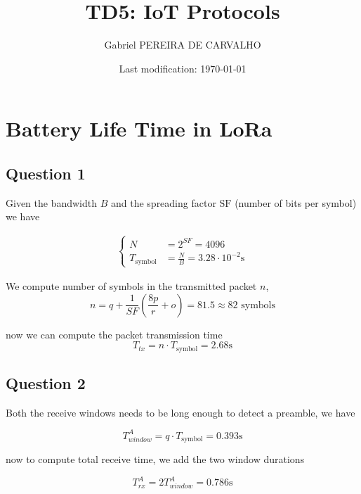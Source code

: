 \documentclass[]{article}
\title{TD5: IoT Protocols}
\author{Gabriel PEREIRA DE CARVALHO}
\date{Last modification: \today}
\begin{document}
	
	\maketitle
	
	\section{Battery Life Time in LoRa}
	
	\subsection*{Question 1}
	
	Given the bandwidth $B$ and the spreading factor $\mathrm{SF}$ (number of bits per symbol) we have
	
	\begin{align}
		\begin{cases}
			N &= 2^{SF} = 4096\\
			T_{\text{symbol}} &= \frac{N}{B} = 3.28 \cdot 10^{-2} \mathrm{s}
		\end{cases}
	\end{align}
	
	We compute number of symbols in the transmitted packet $n$,
	\begin{equation}
		n = q + \frac{1}{SF}\left(\frac{8p}{r} + o\right) = 81.5 \approx 82 \text{ symbols}
	\end{equation}
	
	now we can compute the packet transmission time
	\begin{equation}
		T_{tx} = n \cdot T_{\text{symbol}} = 2.68 \mathrm{s}
	\end{equation}
	
	\subsection*{Question 2}
	
	Both the receive windows needs to be long enough to detect a preamble, we have
	
	\begin{equation}
		T_{window}^A = q \cdot T_{\text{symbol}} = 0.393 \mathrm{s}
	\end{equation}
	
	now to compute total receive time, we add the two window durations
	
	\begin{equation}
		T_{rx}^A = 2T_{window}^A = 0.786 \mathrm{s}
	\end{equation}
	
\end{document}
